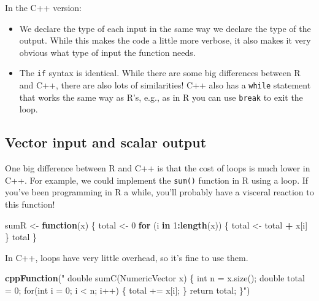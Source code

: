 \documentclass[]{krantz}
\makeatletter
\newenvironment{Shaded}{\begin{snugshade}}{\end{snugshade}}
\newcommand{\ControlFlowTok}[1]{\textcolor[rgb]{0.27,0.27,0.27}{\textbf{#1}}}
\newcommand{\DecValTok}[1]{\textcolor[rgb]{0.06,0.06,0.06}{#1}}
\newcommand{\KeywordTok}[1]{\textcolor[rgb]{0.27,0.27,0.27}{\textbf{#1}}}
\newcommand{\NormalTok}[1]{#1}
\newcommand{\OperatorTok}[1]{\textcolor[rgb]{0.43,0.43,0.43}{\textbf{#1}}}
\newcommand{\StringTok}[1]{\textcolor[rgb]{0.5,0.5,0.5}{#1}}
\newenvironment{kframe}{%
\medskip{}
\setlength{\fboxsep}{.8em}
 \def\at@end@of@kframe{}%
 \ifinner\ifhmode%
  \def\at@end@of@kframe{\end{minipage}}%
  \begin{minipage}{\columnwidth}%
 \fi\fi%
 \def\FrameCommand##1{\hskip\@totalleftmargin \hskip-\fboxsep
 \colorbox{shadecolor}{##1}\hskip-\fboxsep
     \hskip-\linewidth \hskip-\@totalleftmargin \hskip\columnwidth}%
 \MakeFramed {\advance\hsize-\width
   \@totalleftmargin\z@ \linewidth\hsize
   \@setminipage}}%
 {\par\unskip\endMakeFramed%
 \at@end@of@kframe}
\renewenvironment{Shaded}{\begin{kframe}}{\end{kframe}}
\makeatother
\begin{document}
In the C++ version:

\begin{itemize}
\item
  We declare the type of each input in the same way we declare the type of the output. While this makes the code a little more verbose, it also makes it very obvious what type of input the function needs.
\item
  The \texttt{if} syntax is identical. While there are some big differences between R and C++, there are also lots of similarities! C++ also has a \texttt{while} statement that works the same way as R's, e.g., as in R you can use \texttt{break} to exit the loop.
\end{itemize}

\hypertarget{vector-input-and-scalar-output}{%
\subsection{Vector input and scalar output}\label{vector-input-and-scalar-output}}

One big difference between R and C++ is that the cost of loops is much lower in C++. For example, we could implement the \texttt{sum()} function in R using a loop. If you've been programming in R a while, you'll probably have a visceral reaction to this function!

\begin{Shaded}
\begin{Highlighting}[]
\NormalTok{sumR <-}\StringTok{ }\ControlFlowTok{function}\NormalTok{(x) \{}
\NormalTok{  total <-}\StringTok{ }\DecValTok{0}
  \ControlFlowTok{for}\NormalTok{ (i }\ControlFlowTok{in} \DecValTok{1}\OperatorTok{:}\KeywordTok{length}\NormalTok{(x)) \{}
\NormalTok{    total <-}\StringTok{ }\NormalTok{total }\OperatorTok{+}\StringTok{ }\NormalTok{x[i]}
\NormalTok{  \}}
\NormalTok{  total}
\NormalTok{\}}
\end{Highlighting}
\end{Shaded}

In C++, loops have very little overhead, so it's fine to use them.

\begin{Shaded}
\begin{Highlighting}[]
\KeywordTok{cppFunction}\NormalTok{(}\StringTok{"}
\StringTok{  double sumC(NumericVector x) \{}
\StringTok{  int n = x.size();}
\StringTok{  double total = 0;}
\StringTok{  for(int i = 0; i < n; i++) \{}
\StringTok{    total += x[i];}
\StringTok{  \}}
\StringTok{  return total;}
\StringTok{  \}"}\NormalTok{)}
\end{Highlighting}
\end{Shaded}
\end{document}
